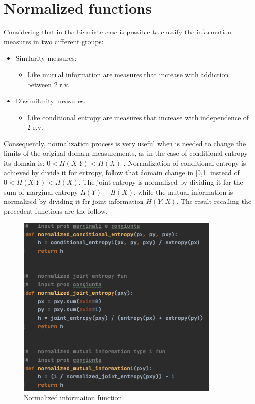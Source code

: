 \documentclass[12pt]{report}
\begin{document}
\section{Normalized functions}
Considering that in the bivariate case is possible to classify the information measures in two different groups:
\begin{itemize}
\item Similarity measures:
    \begin{itemize}
        \item Like mutual information are measures that increase with addiction between 2 r.v. 
    \end{itemize}
\item Dissimilarity measures:
\begin{itemize}
        \item Like conditional entropy are measures that increase with independence of 2 r.v.
    \end{itemize}
\end{itemize}
Consequently, normalization process is very useful when is needed to change the limits of the original domain measurements, as in the case of conditional entropy its domain is: $ 0<H(X|Y)<H(X)$ . Normalization of conditional entropy is achieved by divide it for entropy, follow that domain change in [0,1] instead of $ 0<H(X|Y)<H(X)$. The joint entropy is normalized by dividing it for the sum of marginal entropy $H(Y) + H(X)$, while the mutual information is normalized by dividing it for joint information $H(Y,X)$. The result recalling the precedent functions are the follow.

\begin{figure}[h!]
    \centering
    \includegraphics[width=10cm]{Pictures/Normalized fun.png}
    \caption{Normalized information function}
\end{figure}
\end{document}
